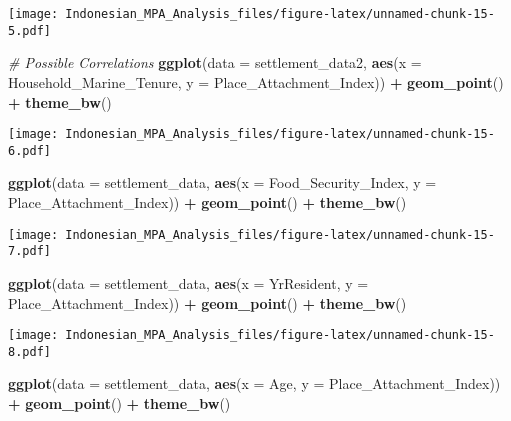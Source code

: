 \documentclass[
]{article}
\newenvironment{Shaded}{\begin{snugshade}}{\end{snugshade}}
\newcommand{\AttributeTok}[1]{\textcolor[rgb]{0.13,0.29,0.53}{#1}}
\newcommand{\CommentTok}[1]{\textcolor[rgb]{0.56,0.35,0.01}{\textit{#1}}}
\newcommand{\FunctionTok}[1]{\textcolor[rgb]{0.13,0.29,0.53}{\textbf{#1}}}
\newcommand{\NormalTok}[1]{#1}
\newcommand{\SpecialCharTok}[1]{\textcolor[rgb]{0.81,0.36,0.00}{\textbf{#1}}}
\begin{document}
\texttt{[image: Indonesian\_MPA\_Analysis\_files/figure-latex/unnamed-chunk-15-5.pdf]}

\begin{Shaded}
\begin{Highlighting}[]
\CommentTok{\# Possible Correlations}
\FunctionTok{ggplot}\NormalTok{(}\AttributeTok{data =}\NormalTok{ settlement\_data2, }\FunctionTok{aes}\NormalTok{(}\AttributeTok{x =}\NormalTok{ Household\_Marine\_Tenure, }
                                    \AttributeTok{y =}\NormalTok{ Place\_Attachment\_Index)) }\SpecialCharTok{+}
  \FunctionTok{geom\_point}\NormalTok{() }\SpecialCharTok{+}
  \FunctionTok{theme\_bw}\NormalTok{()}
\end{Highlighting}
\end{Shaded}

\texttt{[image: Indonesian\_MPA\_Analysis\_files/figure-latex/unnamed-chunk-15-6.pdf]}

\begin{Shaded}
\begin{Highlighting}[]
\FunctionTok{ggplot}\NormalTok{(}\AttributeTok{data =}\NormalTok{ settlement\_data, }\FunctionTok{aes}\NormalTok{(}\AttributeTok{x =}\NormalTok{ Food\_Security\_Index, }
                                   \AttributeTok{y =}\NormalTok{ Place\_Attachment\_Index)) }\SpecialCharTok{+}
  \FunctionTok{geom\_point}\NormalTok{() }\SpecialCharTok{+}
  \FunctionTok{theme\_bw}\NormalTok{()}
\end{Highlighting}
\end{Shaded}

\texttt{[image: Indonesian\_MPA\_Analysis\_files/figure-latex/unnamed-chunk-15-7.pdf]}

\begin{Shaded}
\begin{Highlighting}[]
\FunctionTok{ggplot}\NormalTok{(}\AttributeTok{data =}\NormalTok{ settlement\_data, }\FunctionTok{aes}\NormalTok{(}\AttributeTok{x =}\NormalTok{ YrResident, }
                                   \AttributeTok{y =}\NormalTok{ Place\_Attachment\_Index)) }\SpecialCharTok{+}
  \FunctionTok{geom\_point}\NormalTok{() }\SpecialCharTok{+}
  \FunctionTok{theme\_bw}\NormalTok{()}
\end{Highlighting}
\end{Shaded}

\texttt{[image: Indonesian\_MPA\_Analysis\_files/figure-latex/unnamed-chunk-15-8.pdf]}

\begin{Shaded}
\begin{Highlighting}[]
\FunctionTok{ggplot}\NormalTok{(}\AttributeTok{data =}\NormalTok{ settlement\_data, }\FunctionTok{aes}\NormalTok{(}\AttributeTok{x =}\NormalTok{ Age, }\AttributeTok{y =}\NormalTok{ Place\_Attachment\_Index)) }\SpecialCharTok{+}
  \FunctionTok{geom\_point}\NormalTok{() }\SpecialCharTok{+}
  \FunctionTok{theme\_bw}\NormalTok{()}
\end{Highlighting}
\end{Shaded}
\end{document}
